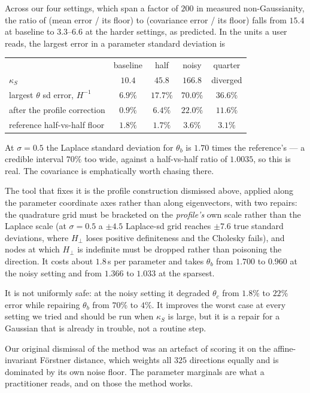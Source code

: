 \documentclass[11pt]{article}
\theoremstyle{plain}
\theoremstyle{definition}
\theoremstyle{remark}
\begin{document}
Across our four settings, which span a factor of $200$ in measured non-Gaussianity, the ratio of
(mean error / its floor) to (covariance error / its floor) falls from $15.4$ at baseline to
$3.3$--$6.6$ at the harder settings, as predicted. In the units a user reads, the largest error in
a parameter standard deviation is

\begin{center}\small
\begin{tabular}{lcccc}
\toprule
 & baseline & half & noisy & quarter \\
$\kappa_S$ & $10.4$ & $45.8$ & $166.8$ & diverged \\
\midrule
largest $\theta$ sd error, $H^{-1}$ & $6.9\%$ & $17.7\%$ & $\mathbf{70.0\%}$ & $36.6\%$\\
after the profile correction & $\mathbf{0.9\%}$ & $\mathbf{6.4\%}$ & $\mathbf{22.0\%}$ & $\mathbf{11.6\%}$\\
reference half-vs-half floor & $1.8\%$ & $1.7\%$ & $3.6\%$ & $3.1\%$\\
\bottomrule
\end{tabular}
\end{center}

At $\sigma = 0.5$ the Laplace standard deviation for $\theta_b$ is $1.70$ times the reference's ---
a credible interval $70\%$ too wide, against a half-vs-half ratio of $1.0035$, so this is real. The
covariance is emphatically worth chasing there.

The tool that fixes it is the profile construction dismissed above, applied along the parameter
coordinate axes rather than along eigenvectors, with two repairs: the quadrature grid must be
bracketed on the \emph{profile's} own scale rather than the Laplace scale (at $\sigma = 0.5$ a
$\pm4.5$ Laplace-sd grid reaches $\pm7.6$ true standard deviations, where $H_\perp$ loses positive
definiteness and the Cholesky fails), and nodes at which $H_\perp$ is indefinite must be dropped
rather than poisoning the direction. It costs about $1.8$\,s per parameter and takes $\theta_b$
from $1.700$ to $0.960$ at the noisy setting and from $1.366$ to $1.033$ at the sparsest.

It is not uniformly safe: at the noisy setting it degraded $\theta_c$ from $1.8\%$ to $22\%$ error
while repairing $\theta_b$ from $70\%$ to $4\%$. It improves the worst case at every setting we
tried and should be run when $\kappa_S$ is large, but it is a repair for a Gaussian that is
already in trouble, not a routine step.

Our original dismissal of the method was an artefact of scoring it on the affine-invariant
F\"orstner distance, which weights all $325$ directions equally and is dominated by its own noise
floor. The parameter marginals are what a practitioner reads, and on those the method works.
\end{document}
